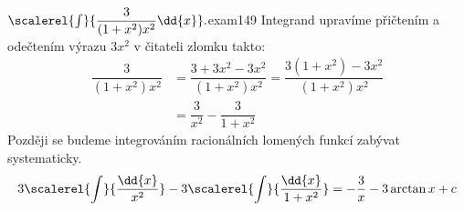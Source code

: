 \begin{mathexam}{\(\scalerel{\int}{\dfrac{3}{(1+x^2)x^2}\dd{x}}.\)}{exam149} 
  Integrand upravíme přičtením a odečtením výrazu \(3x^2\) v čitateli zlomku takto:
  \begin{align*}
    \dfrac{3}{(1+x^2)x^2} 
      &= \dfrac{3+3x^2-3x^2}{(1+x^2)x^2} = \dfrac{3(1+x^2)-3x^2}{(1+x^2)x^2}      \\
      &= \dfrac{3}{x^2} - \dfrac{3}{1+x^2}
  \end{align*}
  Později se budeme integrováním racionálních lomených funkcí zabývat systematicky.
  \[3\scalerel{\int}{\dfrac{\dd{x}}{x^2}} - 3\scalerel{\int}{\dfrac{\dd{x}}{1+x^2}}= -\dfrac{3}{x} -
    3\arctan x + c\]
\end{mathexam}